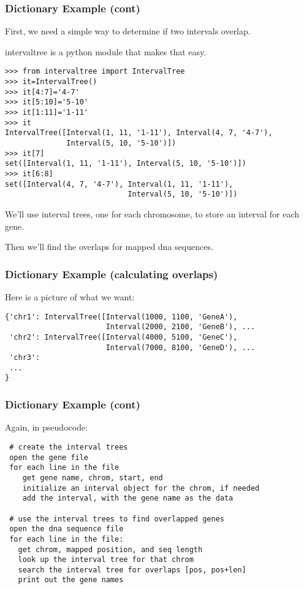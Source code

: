 \documentclass[10pt]{beamer}
\newcommand\smallfont{\fontsize{8pt}{7.2}\selectfont}
\begin{document}
\begin{frame}[fragile]
\frametitle{Dictionary Example (cont)}

First, we need a simple way to determine if two intervals overlap.  
\vspace{2mm}

intervaltree is a python module that makes that easy.

\smallfont
\begin{verbatim}
>>> from intervaltree import IntervalTree
>>> it=IntervalTree()
>>> it[4:7]='4-7'
>>> it[5:10]='5-10'
>>> it[1:11]='1-11'
>>> it
IntervalTree([Interval(1, 11, '1-11'), Interval(4, 7, '4-7'), 
              Interval(5, 10, '5-10')])
>>> it[7]
set([Interval(1, 11, '1-11'), Interval(5, 10, '5-10')])
>>> it[6:8]
set([Interval(4, 7, '4-7'), Interval(1, 11, '1-11'), 
                            Interval(5, 10, '5-10')]) 
\end{verbatim}

We'll use interval trees, one for each chromosome, to store an interval for each gene.
\vspace{2mm}

Then we'll find the overlaps for mapped dna sequences.

\end{frame}

\begin{frame}[fragile]
\frametitle{Dictionary Example (calculating overlaps)}

Here is a picture of what we want:

\smallfont
\begin{verbatim}
{'chr1': IntervalTree([Interval(1000, 1100, 'GeneA'), 
                       Interval(2000, 2100, 'GeneB'), ...
 'chr2': IntervalTree([Interval(4000, 5100, 'GeneC'), 
                       Interval(7000, 8100, 'GeneD'), ...
 'chr3':
 ...
}
\end{verbatim}

\end{frame}


\begin{frame}[fragile]
\frametitle{Dictionary Example (cont)}
\smallfont
Again, in pseudocode:
\begin{verbatim}
 # create the interval trees
 open the gene file
 for each line in the file
    get gene name, chrom, start, end
    initialize an interval object for the chrom, if needed
    add the interval, with the gene name as the data

 # use the interval trees to find overlapped genes
 open the dna sequence file
 for each line in the file:
   get chrom, mapped position, and seq length
   look up the interval tree for that chrom
   search the interval tree for overlaps [pos, pos+len]
   print out the gene names

\end{verbatim}
\end{frame}
\end{document}
